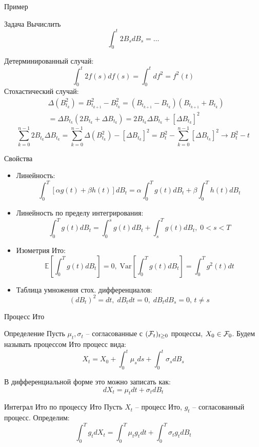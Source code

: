 \documentclass{beamer}
\begin{document}
\begin{frame}{Пример}
    \begin{block}{Задача}
        Вычислить
        $$
            \int_0^t 2 B_s dB_s = \ldots
        $$
    \end{block}
    \pause
    Детерминированный случай:
    $$
        \int_0^t 2 f(s) df(s) = \int_0^t d f^2 = f^2(t)
    $$ 
    \pause
    Стохастический случай:
    \begin{align*}
        &\Delta \left(B_{t_k}^2\right) = B_{t_{k+1}}^2 - B_{t_k}^2 = \left( B_{t_{k+1}}-B_{t_k} \right)
        \left( B_{t_{k+1}}+B_{t_k} \right)\\ 
        &= \Delta B_{t_k} \left( 2 B_{t_k} + \Delta B_{t_k}\right) = 2 B_{t_k} \Delta B_{t_k} + \left[\Delta B_{t_k}\right]^2
    \end{align*} 
    \pause
    $$
        \sum_{k=0}^{n-1} 2 B_{t_k} \Delta B_{t_k} = 
        \sum_{k=0}^{n-1}\Delta \left(B_{t_k}^2\right) - \left[\Delta B_{t_k}\right]^2 = B_t^2 - \sum_{k=0}^{n-1} \left[\Delta B_{t_k}\right]^2 \to B_t^2 - t 
    $$
\end{frame}

\begin{frame}{Свойства}
    \begin{itemize}
        \item Линейность: $$\int_{0}^T \left[\alpha g(t) + \beta h(t)\right] dB_t = \alpha \int_0^T g(t) dB_t + \beta \int_0^T h(t) dB_t$$
        \item Линейность по пределу интегрирования:
        $$\int_0^T g(t) dB_t = \int_0^s g(t) dB_t + \int_s^T g(t) dB_t, \; 0 < s < T$$
        \item Изометрия Ито:
        $$
            \mathbb{E} \left[\int_0^T g(t) dB_t \right] = 0, \; \mathrm{Var} \left[\int_0^T g(t) dB_t\right] = \int_0^T g^2(t) dt
        $$
        \item Таблица умножения стох. дифференциалов:
        $$
            (dB_t)^2 = dt,\; dB_t dt = 0, \; dB_t dB_s = 0, \, t\neq s 
        $$
    \end{itemize}
\end{frame}

\begin{frame}{Процесс Ито}
    \begin{block}{Определение}
        Пусть $\mu_t, \sigma_t$ -- согласованные с $(\mathcal{F}_t)_{t\geq 0}$ процессы, $X_0 \in \mathcal{F}_0$.
        Будем называть процессом Ито процесс вида:
        $$
            X_t = X_0 + \int_0^t \mu_s ds + \int_0^t \sigma_s dB_s
        $$
    \end{block}
    В дифференциальной форме это можно записать как:
    $$
        dX_t = \mu_t dt + \sigma_t dB_t
    $$
    \pause \noident
    \begin{block}{Интеграл Ито по процессу Ито}
        Пусть $X_t$ -- процесс Ито, $g_t$ -- согласованный процесс. Определим:
        $$
            \int_0^T g_t dX_t = \int_0^T \mu_t g_t dt + \int_0^T \sigma_t g_t dB_t
        $$
    \end{block}
\end{frame}
\end{document}

